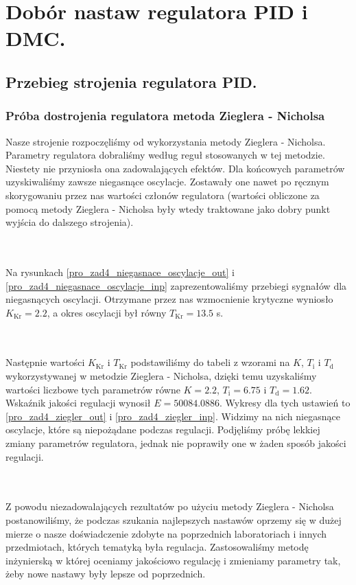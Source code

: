 \chapter{Dobór nastaw regulatora PID i DMC.}
\label{pro4}


\section{Przebieg strojenia regulatora PID.}
\subsection{Próba dostrojenia regulatora metoda Zieglera - Nicholsa}
Nasze strojenie rozpoczęliśmy od wykorzystania metody Zieglera - Nicholsa. Parametry regulatora dobraliśmy według reguł stosowanych w tej metodzie. Niestety nie przyniosła ona zadowalających efektów. Dla końcowych parametrów uzyskiwaliśmy zawsze niegasnące oscylacje. Zostawały one nawet po ręcznym skorygowaniu przez nas wartości członów regulatora (wartości obliczone za pomocą metody Zieglera - Nicholsa były wtedy traktowane jako dobry punkt wyjścia do dalszego strojenia).

~\\\\Na rysunkach \ref{pro_zad4_niegasnace_oscylacje_out} i \ref{pro_zad4_niegasnace_oscylacje_inp} zaprezentowaliśmy przebiegi sygnałów dla niegasnących oscylacji. Otrzymane przez nas wzmocnienie krytyczne wyniosło $K_{\mathrm{Kr}} = 2.2$, a okres oscylacji był równy $T_{\mathrm{Kr}} = \num{13.5}$ s. 

~\\\\ Następnie wartości $K_{\mathrm{Kr}}$ i $T_{\mathrm{Kr}}$ podstawiliśmy do tabeli z wzorami na $K$, $T_{\mathrm{i}}$ i $T_{\mathrm{d}}$ wykorzystywanej w metodzie Zieglera - Nicholsa, dzięki temu uzyskaliśmy wartości liczbowe tych parametrów równe $K = \num{2.2}$, $T_{\mathrm{i}} = \num{6.75}$ i $T_{\mathrm{d}} = \num{1.62}$. Wskaźnik jakości regulacji wynosił $E = 50084.0886$. Wykresy dla tych ustawień to \ref{pro_zad4_ziegler_out} i \ref{pro_zad4_ziegler_inp}. Widzimy na nich niegasnące oscylacje, które są niepożądane podczas regulacji. Podjęliśmy próbę lekkiej zmiany parametrów regulatora, jednak nie poprawiły one w żaden sposób jakości regulacji. 

~\\\\ Z powodu niezadowalających rezultatów po użyciu metody Zieglera - Nicholsa postanowiliśmy, że podczas szukania najlepszych nastawów oprzemy się w dużej mierze o nasze doświadczenie zdobyte na poprzednich laboratoriach i innych przedmiotach, których tematyką była regulacja. Zastosowaliśmy metodę inżynierską w której oceniamy jakościowo regulację i zmieniamy parametry tak, żeby nowe nastawy były lepsze od poprzednich. 

